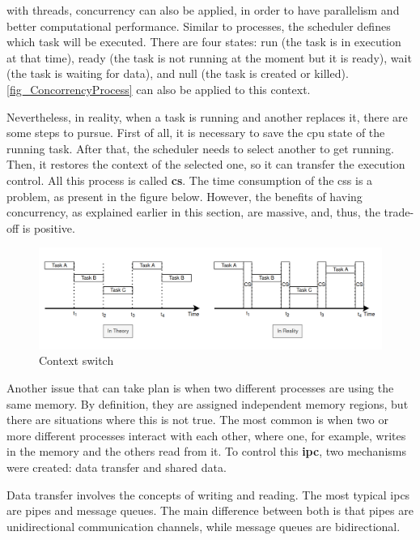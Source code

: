 with threads, concurrency can also be applied, in order to have parallelism and better computational performance. Similar to processes, the scheduler 
defines which task will be executed. There are four states: run (the task is in execution at that time), ready (the task is not running at the 
moment but it is ready), wait (the task is waiting for data), and null (the task is created or killed). \autoref{fig_ConcorrencyProcess} can also 
be applied to this context.

Nevertheless, in reality, when a task is running and another replaces it, there are some steps to pursue. First of all, it 
is necessary to save the \gls{cpu} state of the running task. After that, the scheduler needs to select another to get running. Then, it restores 
the context of the selected one, so it can transfer the execution control. All this process is called \textbf{\gls{cs}}. The time consumption of 
the \glspl{cs} is a problem, as present in the figure below. However, the benefits of having concurrency, as explained earlier in this section, 
are massive, and, thus, the trade-off is positive.

\begin{figure}[H]
	\centering
 	\includegraphics[width=1\linewidth]{Images/ContextSwitch.png}
 	\caption{ Context switch }
	 \label{fig_ContextSwitch}
\end{figure}

Another issue that can take plan is when two different processes are using the same memory. By definition, they are assigned independent 
memory regions, but there are situations where this is not true. The most common is when two or more different processes interact with each other, 
where one, for example, writes in the memory and the others read from it. To control this \textbf{\gls{ipc}}, two mechanisms were created: data 
transfer and shared data.

Data transfer involves the concepts of writing and reading. The most typical \glspl{ipc} are pipes and message queues. The main difference 
between both is that pipes are unidirectional communication channels, while message queues are bidirectional.

